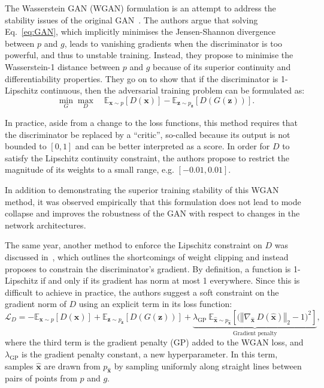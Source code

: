 The Wasserstein GAN (WGAN) formulation is an attempt to address the stability issues of the original GAN~\cite{arjovsky2017wasserstein}. The authors argue that solving Eq.~\ref{eq:GAN}, which implicitly minimises the Jensen-Shannon divergence between $p$ and $g$, leads to vanishing gradients when the discriminator is too powerful, and thus to unstable training.
Instead, they propose to minimise the Wasserstein-1 distance between $p$ and $g$ because of its superior continuity and differentiability properties. They go on to show that if the discriminator is 1-Lipschitz continuous, then the adversarial training problem can be formulated as:
\begin{equation}
    \min_G \max_D \quad 
        \mathbb{E}_{\mathbf{x} \sim p} \left[ D(\mathbf{x}) \right] - 
        \mathbb{E}_{\mathbf{z} \sim p_\mathbf{z}} \left[ D(G(\mathbf{z})) \right].
\end{equation}

In practice, aside from a change to the loss functions, this method requires that the discriminator be replaced by a ``critic'', so-called because its output is not bounded to $[0, 1]$ and can be better interpreted as a score. In order for $D$ to satisfy the Lipschitz continuity constraint, the authors propose to restrict the magnitude of its weights to a small range, e.g. $[-0.01, 0.01]$.

In addition to demonstrating the superior training stability of this WGAN method, it was observed empirically that this formulation does not lead to mode collapse and improves the robustness of the GAN with respect to changes in the network architectures.

The same year, another method to enforce the Lipschitz constraint on $D$ was discussed in~\cite{NIPS2017_892c3b1c}, which outlines the shortcomings of weight clipping and instead proposes to constrain the discriminator's gradient.
By definition, a function is 1-Lipschitz if and only if its gradient has norm at most 1 everywhere. Since this is difficult to achieve in practice, the authors suggest a soft constraint on the gradient norm of $D$ using an explicit term in its loss function:
\begin{equation}\label{eq:WGAN-GP}
    \mathcal{L}_D = 
        -\mathbb{E}_{\mathbf{x} \sim p} \left[ D(\mathbf{x}) \right] +
        \mathbb{E}_{\mathbf{z} \sim p_\mathbf{z}} \left[ D(G(\mathbf{z})) \right] +
        \underbrace{\lambda_\mathrm{GP}\ \mathbb{E}_{\hat{\mathbf{x}} \sim p_{\hat{\mathbf{x}}}}
            \left[ \big( \left\Vert \nabla_{\hat{\mathbf{x}}}\ D(\hat{\mathbf{x}}) \right\Vert_2 - 1 \big) ^2 \right]}_\textrm{Gradient penalty},
\end{equation}
where the third term is the gradient penalty (GP) added to the WGAN loss, and $\lambda_\mathrm{GP}$ is the gradient penalty constant, a new hyperparameter. In this term, samples $\hat{\mathbf{x}}$ are drawn from $p_{\hat{\mathbf{x}}}$ by sampling uniformly along straight lines between pairs of points from $p$ and $g$. 

